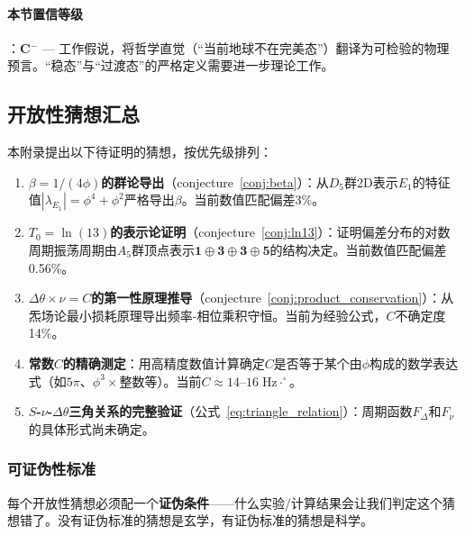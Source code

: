 \paragraph{本节置信等级}：\textbf{C$^-$} --- 工作假说，将哲学直觉（``当前地球不在完美态''）翻译为可检验的物理预言。``稳态''与``过渡态''的严格定义需要进一步理论工作。

\subsection{开放性猜想汇总}
\label{subsec:conjectures}

本附录提出以下待证明的猜想，按优先级排列：

\begin{enumerate}
\item \textbf{$\beta = 1/(4\phi)$的群论导出}（conjecture~\ref{conj:beta}）：从$D_5$群2D表示$E_1$的特征值$|\lambda_{E_1}| = \phi^4 + \phi^2$严格导出$\beta$。当前数值匹配偏差3\%。

\item \textbf{$T_0 = \ln(13)$的表示论证明}（conjecture~\ref{conj:ln13}）：证明偏差分布的对数周期振荡周期由$A_5$群顶点表示$\mathbf{1}\oplus\mathbf{3}\oplus\mathbf{3}\oplus\mathbf{5}$的结构决定。当前数值匹配偏差0.56\%。

\item \textbf{$\Delta\theta \times \nu = C$的第一性原理推导}（conjecture~\ref{conj:product_conservation}）：从炁场论最小损耗原理导出频率-相位乘积守恒。当前为经验公式，$C$不确定度14\%。

\item \textbf{常数$C$的精确测定}：用高精度数值计算确定$C$是否等于某个由$\phi$构成的数学表达式（如$5\pi$、$\phi^3 \times \text{整数}$等）。当前$C \approx 14$--$16\;\text{Hz}\cdot^\circ$。

\item \textbf{$S$-$\nu$-$\Delta\theta$三角关系的完整验证}（公式~\ref{eq:triangle_relation}）：周期函数$F_\Delta$和$F_\nu$的具体形式尚未确定。
\end{enumerate}

\subsubsection{可证伪性标准}
\label{subsubsec:falsifiability}

每个开放性猜想必须配一个\textbf{证伪条件}——什么实验/计算结果会让我们判定这个猜想错了。没有证伪标准的猜想是玄学，有证伪标准的猜想是科学。


